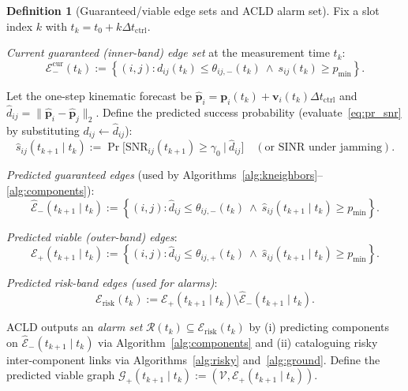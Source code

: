 \documentclass[preprint,12pt]{elsarticle}
\theoremstyle{definition}\newtheorem{definition}{Definition}
\theoremstyle{plain}\newtheorem{theorem}{Theorem}
\theoremstyle{plain}\newtheorem{lemma}{Lemma}
\theoremstyle{plain}\newtheorem{corollary}{Corollary}
\theoremstyle{plain}\newtheorem{assumption}{Assumption}
\theoremstyle{remark}\newtheorem{remark}[theorem]{Remark}
\begin{document}
\begin{definition}[Guaranteed/viable edge sets and ACLD alarm set]
\label{def:edge_sets}
Fix a slot index $k$ with $t_k=t_0+k\Delta t_{\text{ctrl}}$.

\emph{Current guaranteed (inner-band) edge set} at the measurement time $t_k$:
\[
  \mathcal E_-^{\mathrm{cur}}(t_k)
  :=
  \left\{(i,j): d_{ij}(t_k)\le \theta_{ij,-}(t_k)\ \land\ s_{ij}(t_k)\ge p_{\min}\right\}.
\]

Let the one-step kinematic forecast be
$\widehat{\boldsymbol p}_i=\boldsymbol p_i(t_k)+\boldsymbol v_i(t_k)\Delta t_{\text{ctrl}}$
and $\widehat d_{ij}=\|\widehat{\boldsymbol p}_i-\widehat{\boldsymbol p}_j\|_2$.
Define the predicted success probability (evaluate~\eqref{eq:pr_snr} by substituting $d_{ij}\leftarrow \widehat d_{ij}$):
\[
  \widehat s_{ij}(t_{k+1}\mid t_k) := \Pr\!\big[\mathrm{SNR}_{ij}(t_{k+1})\ge \gamma_0\ \big|\ \widehat d_{ij}\big]
  \quad (\text{or SINR under jamming}).
\]

\emph{Predicted guaranteed edges} (used by Algorithms~\ref{alg:kneighbors}--\ref{alg:components}):
\[
  \widehat{\mathcal E}_-(t_{k+1}\mid t_k)
  :=
  \left\{(i,j): \widehat d_{ij}\le \theta_{ij,-}(t_k)\ \land\ \widehat s_{ij}(t_{k+1}\mid t_k)\ge p_{\min}\right\}.
\]

\emph{Predicted viable (outer-band) edges}:
\[
  \mathcal E_+(t_{k+1}\mid t_k)
  :=
  \left\{(i,j): \widehat d_{ij}\le \theta_{ij,+}(t_k)\ \land\ \widehat s_{ij}(t_{k+1}\mid t_k)\ge p_{\min}\right\}.
\]

\emph{Predicted risk-band edges (used for alarms)}:
\[
  \mathcal E_{\mathrm{risk}}(t_k)
  := \mathcal E_+(t_{k+1}\mid t_k)\setminus \widehat{\mathcal E}_-(t_{k+1}\mid t_k).
\]

ACLD outputs an \emph{alarm set} $\mathcal R(t_k)\subseteq \mathcal E_{\mathrm{risk}}(t_k)$ by
(i) predicting components on $\widehat{\mathcal E}_-(t_{k+1}\mid t_k)$ via Algorithm~\ref{alg:components} and
(ii) cataloguing risky inter-component links via Algorithms~\ref{alg:risky} and~\ref{alg:ground}. Define the predicted viable graph $\mathcal G_+(t_{k+1}\mid t_k) := (\mathcal V, \mathcal E_+(t_{k+1}\mid t_k))$.
\end{definition}
\end{document}
